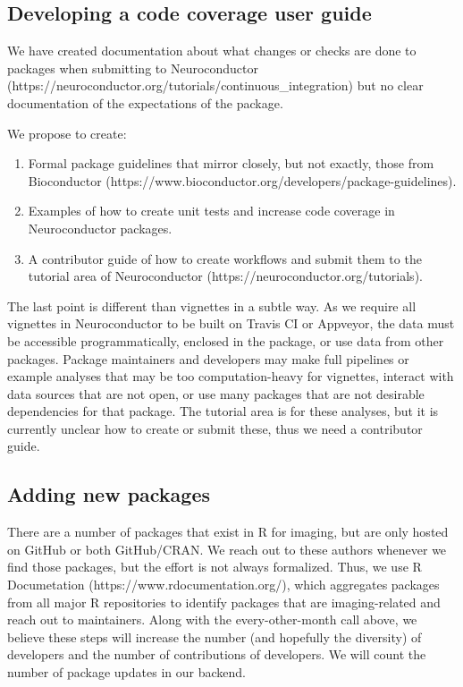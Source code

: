 \documentclass[]{elsarticle} %
\providecommand{\tightlist}{%
  \setlength{\itemsep}{0pt}\setlength{\parskip}{0pt}}
\begin{document}
\subsection{Developing a code coverage user
guide}\label{developing-a-code-coverage-user-guide}

We have created documentation about what changes or checks are done to
packages when submitting to Neuroconductor
(https://neuroconductor.org/tutorials/continuous\_integration) but no
clear documentation of the expectations of the package.

We propose to create:

\begin{enumerate}
\def\labelenumi{\arabic{enumi}.}
\tightlist
\item
  Formal package guidelines that mirror closely, but not exactly, those
  from Bioconductor
  (https://www.bioconductor.org/developers/package-guidelines).
\item
  Examples of how to create unit tests and increase code coverage in
  Neuroconductor packages.
\item
  A contributor guide of how to create workflows and submit them to the
  tutorial area of Neuroconductor
  (https://neuroconductor.org/tutorials).
\end{enumerate}

The last point is different than vignettes in a subtle way. As we
require all vignettes in Neuroconductor to be built on Travis CI or
Appveyor, the data must be accessible programmatically, enclosed in the
package, or use data from other packages. Package maintainers and
developers may make full pipelines or example analyses that may be too
computation-heavy for vignettes, interact with data sources that are not
open, or use many packages that are not desirable dependencies for that
package. The tutorial area is for these analyses, but it is currently
unclear how to create or submit these, thus we need a contributor guide.

\subsection{Adding new packages}\label{adding-new-packages}

There are a number of packages that exist in R for imaging, but are only
hosted on GitHub or both GitHub/CRAN. We reach out to these authors
whenever we find those packages, but the effort is not always
formalized. Thus, we use R Documetation
(https://www.rdocumentation.org/), which aggregates packages from all
major R repositories to identify packages that are imaging-related and
reach out to maintainers. Along with the every-other-month call above,
we believe these steps will increase the number (and hopefully the
diversity) of developers and the number of contributions of developers.
We will count the number of package updates in our backend.
\end{document}
